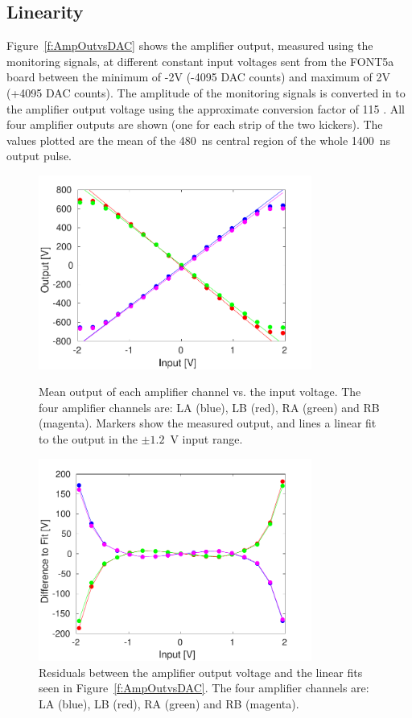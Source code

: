 \subsection{Linearity}
\label{ss:ampLin}

Figure~\ref{f:AmpOutvsDAC} shows the amplifier output, measured using the monitoring signals, at different constant input voltages sent from the FONT5a board between the minimum of -2V (-4095 DAC counts) and maximum of 2V (+4095 DAC counts). The amplitude of the monitoring signals is converted in to the amplifier output voltage using the approximate conversion factor of 115 \cite{colinPriv}. All four amplifier outputs are shown (one for each strip of the two kickers). The values plotted are the mean of the 480~ns central region of the whole 1400~ns output pulse.

\begin{figure}
  \centering
  \includegraphics[width=0.8\textwidth]{Figures/commissioning/AmpOutvsDAC}
  \caption{Mean output of each amplifier channel vs. the input voltage. The four amplifier channels are: LA (blue), LB (red), RA (green) and RB (magenta). Markers show the measured output, and lines a linear fit to the output in the \(\pm1.2\)~V input range.}
  \label{f:AmpOutvsDAC}
  \includegraphics[width=0.8\textwidth]{Figures/commissioning/AmpOutvsDAC_residual}
  \caption{Residuals between the amplifier output voltage and the linear fits seen in Figure~\ref{f:AmpOutvsDAC}. The four amplifier channels are: LA (blue), LB (red), RA (green) and RB (magenta). }
  \label{f:AmpOutvsDAC_residual}
\end{figure}

